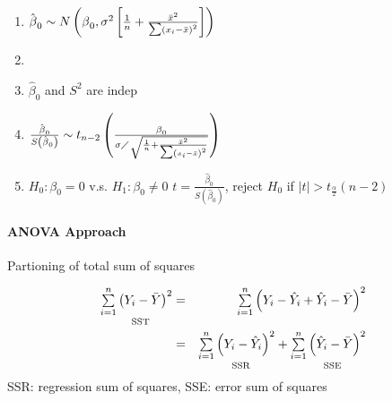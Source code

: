 \documentclass{article}
\begin{document}
\begin{enumerate}
\begin{enumerate}
\item $\hat{\beta}_{0}\sim N\left( \beta _{0},\sigma ^{2}\left[ \frac{1}{n}+%
\frac{\bar{x}^{2}}{\tsum \left( x_{i}-\bar{x}\right) ^{2}}\right] \right) $

\item 

\item $\hat{\beta}_{0}$ and $S^{2}$ are indep

\item $\frac{\hat{\beta}_{0}}{S\left( \hat{\beta}_{0}\right) }\sim
t_{n-2}\left( \frac{\beta _{0}}{\sigma \diagup \sqrt{\frac{1}{n}+\frac{\bar{x%
}^{2}}{\tsum \left( x_{i}-\bar{x}\right) ^{2}}}}\right) $

\item $H_{0}:\beta _{0}=0$ v.s. $H_{1}:\beta _{0}\neq 0$\newline
$t=\frac{\hat{\beta}_{0}}{S\left( \hat{\beta}_{0}\right) }$, reject $H_{0}$
if $\left\vert t\right\vert >t_{\frac{\alpha }{2}}\left( n-2\right) $
\end{enumerate}
\end{enumerate}

\bigskip 

\paragraph{ANOVA Approach}

Partioning of total sum of squares

\begin{eqnarray*}
\underset{\text{SST}}{\tsum\limits_{i=1}^{n}\left( Y_{i}-\bar{Y}\right) ^{2}}
&=&\tsum\limits_{i=1}^{n}\left( Y_{i}-\hat{Y}_{i}+\hat{Y}_{i}-\bar{Y}\right)
^{2} \\
&=&\underset{\text{SSR}}{\tsum\limits_{i=1}^{n}\left( Y_{i}-\hat{Y}%
_{i}\right) ^{2}}+\underset{\text{SSE}}{\tsum\limits_{i=1}^{n}\left( \hat{Y}%
_{i}-\bar{Y}\right) ^{2}}
\end{eqnarray*}%
SSR: regression sum of squares, SSE: error sum of squares
\end{document}
